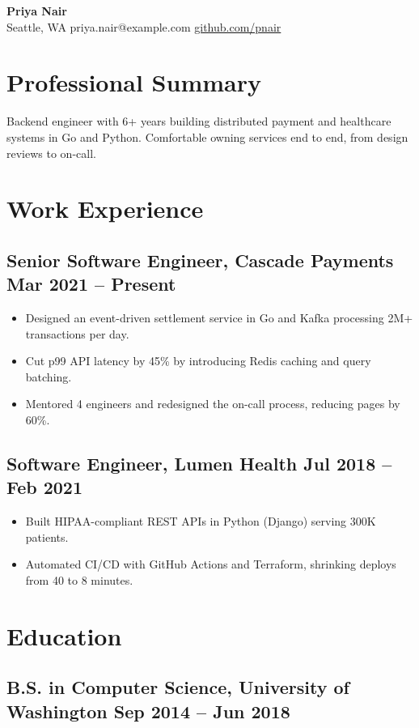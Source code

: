 \documentclass[11pt]{article}
\begin{document}
\begin{center}
  {\LARGE \textbf{Priya Nair}}\\
  Seattle, WA \textbar{} priya.nair@example.com \textbar{} \href{https://github.com/pnair}{github.com/pnair}
\end{center}

\section*{Professional Summary}
Backend engineer with 6+ years building distributed payment and healthcare systems in Go and
Python. Comfortable owning services end to end, from design reviews to on-call.

\section*{Work Experience}
\subsection*{Senior Software Engineer, Cascade Payments \hfill Mar 2021 -- Present}
\begin{itemize}
  \item Designed an event-driven settlement service in Go and Kafka processing 2M+ transactions per day.
  \item Cut p99 API latency by 45\% by introducing Redis caching and query batching.
  \item Mentored 4 engineers and redesigned the on-call process, reducing pages by 60\%.
\end{itemize}

\subsection*{Software Engineer, Lumen Health \hfill Jul 2018 -- Feb 2021}
\begin{itemize}
  \item Built HIPAA-compliant REST APIs in Python (Django) serving 300K patients.
  \item Automated CI/CD with GitHub Actions and Terraform, shrinking deploys from 40 to 8 minutes.
\end{itemize}

\section*{Education}
\subsection*{B.S. in Computer Science, University of Washington \hfill Sep 2014 -- Jun 2018}
\end{document}
